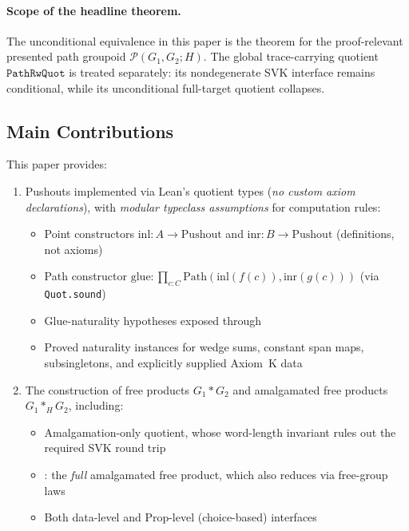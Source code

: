 \documentclass{lmcs}
\theoremstyle{definition}
\theoremstyle{plain}
\theoremstyle{remark}
\newcommand{\Path}{\mathrm{Path}}
\newcommand{\Pushout}{\mathrm{Pushout}}
\newcommand{\inl}{\mathrm{inl}}
\newcommand{\inr}{\mathrm{inr}}
\newcommand{\glmark}{\mathrm{glue}}
\newcommand{\FreeProduct}{\ast}
\newcommand{\AmalgProduct}{\ast}
\begin{document}
\paragraph{Scope of the headline theorem.} The unconditional equivalence in
this paper is the theorem for the proof-relevant presented path groupoid
$\mathcal P(G_1,G_2;H)$. The global trace-carrying quotient
$\texttt{PathRwQuot}$ is treated separately: its nondegenerate SVK interface
remains conditional, while its unconditional full-target quotient collapses.

\subsection{Main Contributions}

This paper provides:

\begin{enumerate}
    \item Pushouts implemented via Lean's quotient types (\emph{no custom axiom declarations}), with \emph{modular typeclass assumptions} for computation rules:
    \begin{itemize}
        \item Point constructors $\inl : A \to \Pushout$ and $\inr : B \to \Pushout$ (definitions, not axioms)
        \item Path constructor $\glmark : \prod_{c:C} \Path(\inl(f(c)), \inr(g(c)))$ (via \texttt{Quot.sound})
        \item Glue-naturality hypotheses exposed through
        \item Proved naturality instances for wedge sums, constant span maps,
        subsingletons, and explicitly supplied Axiom~K data
    \end{itemize}

    \item The construction of free products $G_1 \FreeProduct G_2$ and amalgamated free products $G_1 \AmalgProduct_H G_2$, including:
    \begin{itemize}
        \item Amalgamation-only quotient, whose word-length invariant rules out
        the required SVK round trip
        \item {}: the \emph{full} amalgamated
        free product, which also reduces via free-group laws
        \item Both data-level and Prop-level (choice-based) interfaces
    \end{itemize}


\end{enumerate}
\end{document}
